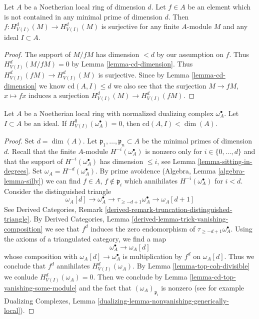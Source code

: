 \begin{lemma}
\label{lemma-top-coh-divisible}
Let $A$ be a Noetherian local ring of dimension $d$. Let $f \in A$
be an element which is not contained in any minimal prime of
dimension $d$. Then $f : H^d_{V(I)}(M) \to H^d_{V(I)}(M)$
is surjective for any finite $A$-module $M$ and any ideal $I \subset A$.
\end{lemma}

\begin{proof}
The support of $M/fM$ has dimension $< d$ by our assumption on $f$.
Thus $H^d_{V(I)}(M/fM) = 0$ by Lemma \ref{lemma-cd-dimension}.
Thus $H^d_{V(I)}(fM) \to H^d_{V(I)}(M)$ is surjective.
Since by Lemma \ref{lemma-cd-dimension} we know $\text{cd}(A, I) \leq d$
we also see that the surjection $M \to fM$, $x \mapsto fx$
induces a surjection $H^d_{V(I)}(M) \to H^d_{V(I)}(fM)$.
\end{proof}

\begin{lemma}
\label{lemma-cd-bound-dualizing}
Let $A$ be a Noetherian local ring with
normalized dualizing complex $\omega_A^\bullet$.
Let $I \subset A$ be an ideal.
If $H^0_{V(I)}(\omega_A^\bullet) = 0$, then $\text{cd}(A, I) < \dim(A)$.
\end{lemma}

\begin{proof}
Set $d = \dim(A)$. Let $\mathfrak p_1, \ldots, \mathfrak p_n \subset A$
be the minimal primes of dimension $d$.
Recall that the finite $A$-module
$H^{-i}(\omega_A^\bullet)$ is nonzero only for
$i \in \{0, \ldots, d\}$ and that the support
of $H^{-i}(\omega_A^\bullet)$ has dimension $\leq i$, see
Lemma \ref{lemma-sitting-in-degrees}.
Set $\omega_A = H^{-d}(\omega_A^\bullet)$.
By prime avoidence (Algebra, Lemma \ref{algebra-lemma-silly})
we can find $f \in A$, $f \not \in \mathfrak p_i$
which annihilates $H^{-i}(\omega_A^\bullet)$ for $i < d$.
Consider the distinguished triangle
$$
\omega_A[d] \to \omega_A^\bullet \to
\tau_{\geq -d + 1}\omega_A^\bullet \to \omega_A[d + 1]
$$
See Derived Categories, Remark
\ref{derived-remark-truncation-distinguished-triangle}.
By Derived Categories, Lemma \ref{derived-lemma-trick-vanishing-composition}
we see that $f^d$ induces the zero endomorphism of
$\tau_{\geq -d + 1}\omega_A^\bullet$.
Using the axioms of a triangulated category, we find a map
$$
\omega_A^\bullet \to \omega_A[d]
$$
whose composition with $\omega_A[d] \to \omega_A^\bullet$ is
multiplication by $f^d$ on $\omega_A[d]$.
Thus we conclude that $f^d$ annihilates $H^d_{V(I)}(\omega_A)$.
By Lemma \ref{lemma-top-coh-divisible} we conlude $H^d_{V(I)}(\omega_A) = 0$.
Then we conclude by Lemma \ref{lemma-cd-top-vanishing-some-module}
and the fact that $(\omega_A)_{\mathfrak p_i}$ is nonzero
(see for example
Dualizing Complexes, Lemma
\ref{dualizing-lemma-nonvanishing-generically-local}).
\end{proof}


